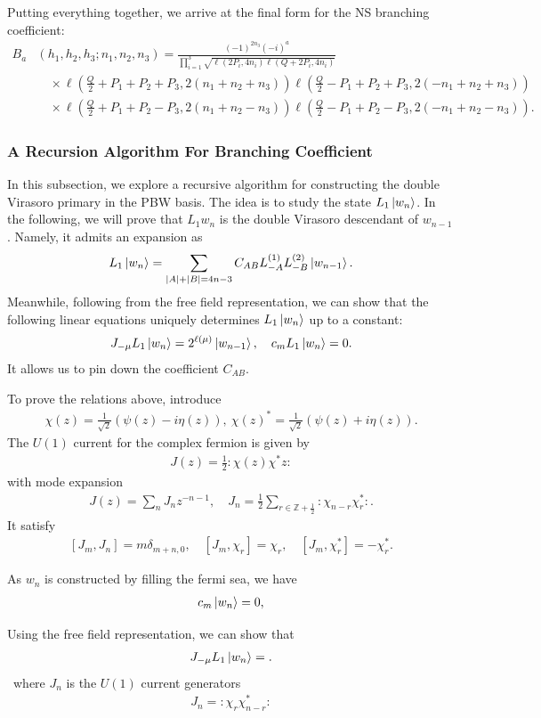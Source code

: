 \documentclass[12pt]{article}
\newcommand{\ie}{\begin{equation}\begin{aligned}}
\newcommand{\fe}{\end{aligned}\end{equation}}
\numberwithin{equation}{section}
\begin{document}
Putting everything together, we arrive at the final form for the NS branching coefficient:
\ie
B_a&(h_1, h_2, h_3;n_1, n_2, n_3) = \frac{(-1)^{2n_3}(-i)^a}{\prod_{i=1}^3\sqrt{\ell(2P_i, 4n_i)\ell(Q+2P_i, 4n_i)}}\\
&\quad \times \ell\left(\tfrac{Q}{2}+P_1+P_2+P_3, 2(n_1+n_2+n_3)\right)\ell\left(\tfrac{Q}{2}-P_1+P_2+P_3, 2(-n_1+n_2+n_3)\right)\\
&\quad \times \ell\left(\tfrac{Q}{2}+P_1+P_2-P_3, 2(n_1+n_2-n_3)\right) \ell\left(\tfrac{Q}{2}-P_1+P_2-P_3, 2(-n_1+n_2-n_3)\right).
\fe

\subsubsection*{A Recursion Algorithm For Branching Coefficient}


In this subsection, we explore a recursive algorithm for constructing the double Virasoro primary in the PBW basis. The idea is to study the state $L_1 \ket{w_n}$. In the following, we will prove that $L_1 w_n$ is the double Virasoro descendant of $w_{n-1}$. Namely, it admits an expansion as
\ie
L_1\ket{w_n} =\sum_{|A|+|B|=4n-3} C_{AB} L_{-A}^{(1)} L_{-B}^{(2)}  \ket{w_{n-1}} .
\fe
Meanwhile, following from the free field representation, we can show that the following linear equations uniquely determines $L_1 \ket{w_n}$ up to a constant:
\ie
J_{-\mu} L_1 \ket{w_n}= 2^{\ell(\mu)} \ket{w_{n-1}},\quad  c_m L_1 \ket{w_n}= 0.
\fe
It allows us to pin down the coefficient $C_{AB}$.

To prove the relations above, introduce
\ie
\chi(z)= \frac{1}{\sqrt{2}}\left(\psi(z)-i\eta(z)\right),~ \chi(z)^*= \frac{1}{\sqrt{2}}\left(\psi(z)+i\eta(z)\right).
\fe
The $U(1)$ current for the complex fermion is given by
\ie
J(z) =\frac{1}{2} : \chi(z)\chi^*{z}:
\fe
with mode expansion
\ie
J(z)=\sum_{n} J_{n} z^{-n-1}, \quad J_{n}=\frac{1}{2}\sum_{r\in \mathbb{Z}+\frac{1}{2}} :\chi_{n-r}\chi^*_{r}:.
\fe
It satisfy
\ie
[J_m,J_n] = m\delta_{m+n,0}, \quad [J_m,\chi_r] = \chi_r,\quad [J_m,\chi^*_r] = -\chi^*_r.
\fe



As $w_n$ is constructed by filling the fermi sea, we have 
\ie
c_m \ket{w_n}=0, 
\fe



Using the free field representation, we can show that
\ie
J_{-\mu}L_1 \ket{w_n}= .
\fe\
where $J_n$ is the $U(1)$ current generators
\ie
J_n= :\chi_{r}\chi^*_{n-r}:
\fe
\end{document}
